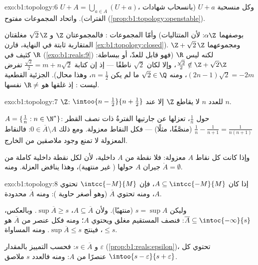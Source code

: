\begin{solution}{exo:b1:topology:6}
$U + A = \bigcup_{a \in A} (U + a)$، وكل منسحبة $U + a$
 (بانسحاب شهادات الفترات). واتحاد المجموعات 
مفتوح (\cref{prop:b1:topology:openstable}).

وأمّا المجموعات : فالمجموعتان $\Z$ و $\sqrt 2\,\Z$ مغلقتان (بوصفهما $\alpha\Z$:
لأن المتتاليات المتقاربة ثابتة في النهاية، قارن
\cref{ex:b1:topology:closed}). ومجموعهما $\Z + \sqrt 2\,\Z$ كثيف
في $\R$ (\cref{exo:b1:reals:9}) لكنه ليس $\R$ (فهو قابل للعدّ، أو
ببساطة: $\frac{\sqrt 2}{2} \notin \Z + \sqrt2\Z$، وإلا لكان $\sqrt 2$
ناطقًا --- إذ إن كتابة $\frac{\sqrt2}{2} = m + n\sqrt 2$
تفرض $(2n - 1)\sqrt 2 = -2m$، ومنه $\sqrt 2 \in \Q$ ما لم يكن $n =
\frac12$، وهذا محال).  الجزئية القطعية  ليست : إذ
غلقها هو $\R \neq$ نفسها.
\end{solution}

\begin{solution}{exo:b1:topology:7}
$\Z$:  $\intoo{n - \frac12}{n + \frac12}$ للعدد $n$
لا يقاطع $\Z$ إلا عند $n$.

$A = \{\frac1n : n \in \N^*\}$: حول $\frac 1n$، تعزلها عن جارتيها الفترةُ ذات
نصف القطر $\frac{1}{n} - \frac{1}{n+1} = \frac{1}{n(n+1)}$ (منصَّفًا، مثلًا)
--- فكل النقاط معزولة. ومع ذلك $0 \in
\overline A \setminus A$: فالنقاط المعزولة لا تمنع وجود
ملاصقين من الخارج.

وإذا كانت كل نقاط $A$ معزولة: فلا نقطة من $A$ داخلية، لأن
لكل نقطة داخلية  كاملة من جيران $A$ حولها
( غير منتهية)، وهذا يناقض العزلة. ومنه $\mathring A
= \emptyset$.
\end{solution}

\begin{solution}{exo:b1:topology:8}
إذا كان $A \subseteq \intcc{-M}{M}$، فإن  $\intcc{-M}{M}$
تحتوي $A$، ومنه تحتوي $\overline A$ (وهو أصغر حاوية
): ومنه  $\overline A$ محدودة.

وليكن $s = \sup A$ (منتهيًا). ولأن $A \subseteq \overline A$، $\sup
\overline A \geq s$. وبالعكس، $\overline A \subseteq
\intoc{-\infty}{s}$: فنصف المستقيم مغلق ويحتوي $A$؛ ومنه
فكل عنصر من $\overline A$ هو $\leq s$، فينتج $\sup\overline A
\leq s$. ومنه المساواة.

و $s \in \overline A$: فحسب التمييز بالمقدار $\varepsilon$
(\cref{prop:b1:reals:epsilon})، تحتوي كل  $\intoo{s -
\varepsilon}{s + \varepsilon}$ عنصرًا من $A$: ومنه فالعدد $s$
ملاصق.
\end{solution}

